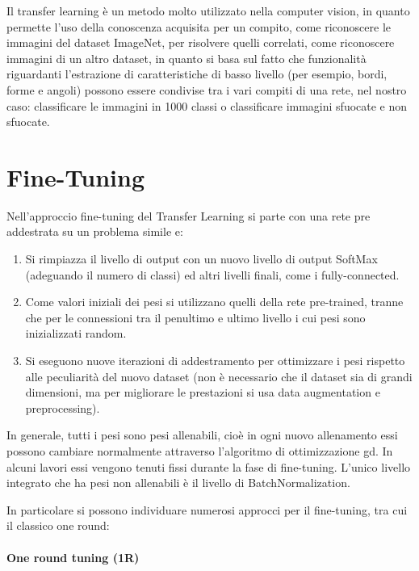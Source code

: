 Il transfer learning è un metodo molto utilizzato nella computer vision, in quanto permette l'uso della conoscenza acquisita per un
compito, come riconoscere le immagini del dataset ImageNet, per risolvere quelli correlati, come riconoscere immagini di un altro dataset, in quanto si basa sul fatto che
funzionalità riguardanti l'estrazione di caratteristiche di basso livello
(per esempio, bordi, forme e angoli) possono essere condivise tra i vari compiti di una rete, nel nostro caso: classificare le immagini in 1000 classi o classificare immagini sfuocate e non sfuocate\cite{patrini_tl}.




\section{Fine-Tuning}\label{fine-tuning}

Nell'approccio fine-tuning del Transfer Learning si parte con una rete pre addestrata su un problema simile e:
\begin{enumerate}
    \item Si rimpiazza il livello di output con un nuovo livello di output \gls{SoftMax} (adeguando il numero di classi) ed altri livelli finali, come i \gls{fully-connected}.
    \item Come valori iniziali dei pesi si utilizzano quelli della rete pre-trained, tranne che per le connessioni tra il penultimo e ultimo livello i cui pesi sono inizializzati random.
    \item Si eseguono nuove iterazioni di addestramento per ottimizzare i pesi rispetto alle peculiarità del nuovo dataset (non è necessario che il dataset sia di grandi dimensioni, ma per migliorare le prestazioni si usa data augmentation e preprocessing).
\end{enumerate}

In generale, tutti i pesi sono pesi allenabili, cioè in  ogni nuovo allenamento essi possono cambiare normalmente attraverso l'algoritmo di ottimizzazione \gls{gd}. In alcuni lavori essi vengono tenuti fissi durante la fase di fine-tuning. L'unico livello integrato che ha pesi non allenabili è il livello di \gls{BatchNormalization}\cite{team_keras_nodate}\cite{lumini_plankton}.

In particolare si possono individuare numerosi approcci per il fine-tuning, tra cui il classico one round:
\paragraph {One round tuning (1R)} \label{one-round-tuning}

